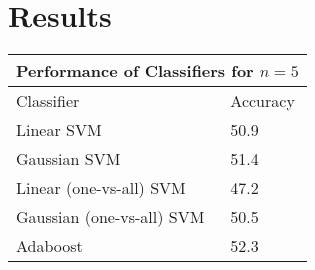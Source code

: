 \documentclass[paper=a4, fontsize=11pt]{scrartcl}
\numberwithin{equation}{section}		%
\numberwithin{figure}{section}			%
\numberwithin{table}{section}				%
\begin{document}
\section{Results}



\begin{tabular}{ |p{3cm}||p{3cm}|  }
 \hline
 \multicolumn{2}{|c|}{Performance of Classifiers for $n=5$} \\
 \hline
Classifier & Accuracy \\
 \hline
 Linear SVM   & 50.9 \\
 Gaussian SVM &   51.4 \\
 Linear (one-vs-all) SVM & 47.2 \\
 Gaussian (one-vs-all) SVM    & 50.5 \\
 Adaboost & 52.3 \\
 \hline
\end{tabular}
\end{document}
